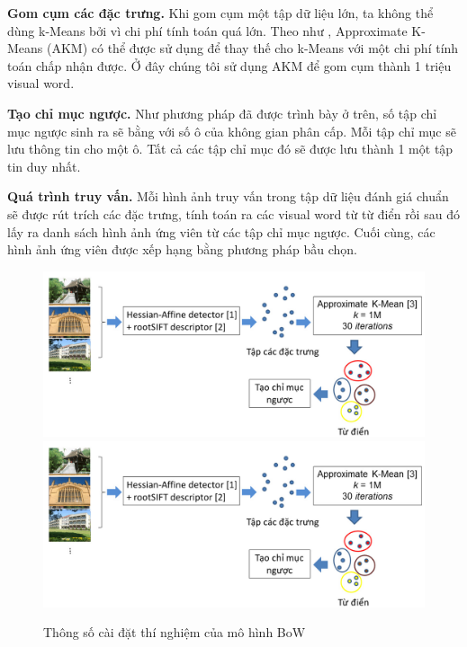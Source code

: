 \textbf{Gom cụm các đặc trưng.} Khi gom cụm một tập dữ liệu lớn, ta không thể dùng k-Means bởi vì chi phí tính toán quá lớn. Theo như \cite{philbin2007object}, Approximate K-Means (AKM) có thể được sử dụng để thay thế cho k-Means với một chi phí tính toán chấp nhận được. Ở đây chúng tôi sử dụng AKM để gom cụm thành 1 triệu visual word.

\textbf{Tạo chỉ mục ngược.} Như phương pháp đã được trình bày ở trên, số tập chỉ mục ngược sinh ra sẽ bằng với số ô của không gian phân cấp. Mỗi tập chỉ mục sẽ lưu thông tin cho một ô. Tất cả các tập chỉ mục đó sẽ được lưu thành 1 một tập tin duy nhất.

\textbf{Quá trình truy vấn.} Mỗi hình ảnh truy vấn trong tập dữ liệu đánh giá chuẩn sẽ được rút trích các đặc trưng, tính toán ra các visual word từ từ điển rồi sau đó lấy ra danh sách hình ảnh ứng viên từ các tập chỉ mục ngược. Cuối cùng, các hình ảnh ứng viên được xếp hạng bằng phương pháp bầu chọn.

\begin{figure}[!htbp]
  \begin{center}
    \leavevmode
    \ifpdf
      \includegraphics[scale=0.23]{experiment_setting}
    \else
      \includegraphics[scale=0.23]{experiment_setting}
    \fi
    \caption[Thông số cài đặt thí nghiệm của mô hình BoW]{Thông số cài đặt thí nghiệm của mô hình BoW}
    \label{FigExperimentSetting}
  \end{center}
\end{figure}

